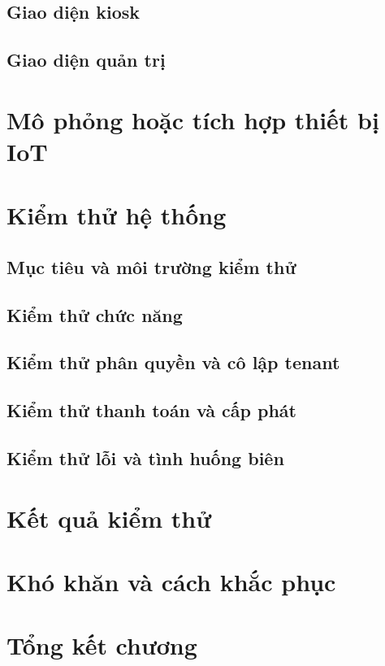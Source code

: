 \subsection{Giao diện kiosk}
\subsection{Giao diện quản trị}
\section{Mô phỏng hoặc tích hợp thiết bị IoT}
\section{Kiểm thử hệ thống}
\subsection{Mục tiêu và môi trường kiểm thử}
\subsection{Kiểm thử chức năng}
\subsection{Kiểm thử phân quyền và cô lập tenant}
\subsection{Kiểm thử thanh toán và cấp phát}
\subsection{Kiểm thử lỗi và tình huống biên}
\section{Kết quả kiểm thử}
\section{Khó khăn và cách khắc phục}
\section{Tổng kết chương}
